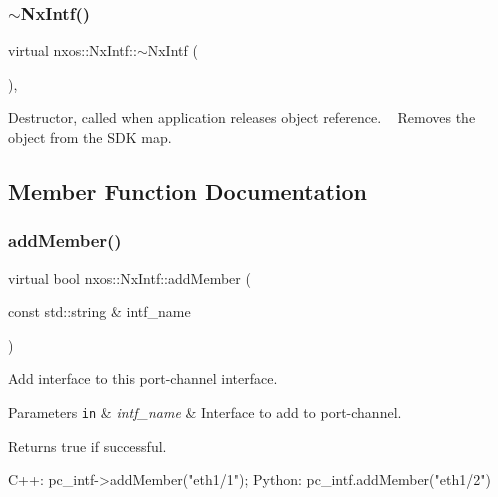 \subsubsection{\texorpdfstring{$\sim$\+Nx\+Intf()}{~NxIntf()}}
{\footnotesize\ttfamily virtual nxos\+::\+Nx\+Intf\+::$\sim$\+Nx\+Intf (\begin{DoxyParamCaption}{ }\end{DoxyParamCaption})\hspace{0.3cm}{\ttfamily [inline]}, {\ttfamily [virtual]}}

Destructor, called when application releases object reference. ~\newline
Removes the object from the S\+DK map. 

\subsection{Member Function Documentation}
\mbox{\label{classnxos_1_1_nx_intf_a499756ef5447cd4037d095a444aefc99}} 
\subsubsection{\texorpdfstring{add\+Member()}{addMember()}}
{\footnotesize\ttfamily virtual bool nxos\+::\+Nx\+Intf\+::add\+Member (\begin{DoxyParamCaption}\item[{const std\+::string \&}]{intf\+\_\+name }\end{DoxyParamCaption})\hspace{0.3cm}{\ttfamily [pure virtual]}}

Add interface to this port-\/channel interface. 
\begin{DoxyParams}[1]{Parameters}
\mbox{\tt in}  & {\em intf\+\_\+name} & Interface to add to port-\/channel. \\
\hline
\end{DoxyParams}
\begin{DoxyReturn}{Returns}
true if successful. ~\newline

\end{DoxyReturn}

\begin{DoxyCode}
C++:
   pc\_intf->addMember(\textcolor{stringliteral}{"eth1/1"});
Python:
   pc\_intf.addMember(\textcolor{stringliteral}{"eth1/2"})
\end{DoxyCode}



